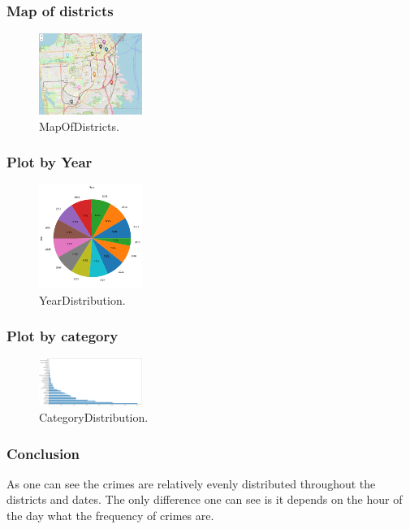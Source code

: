 \documentclass[../Main.tex]{subfiles}
\begin{document}
\subsubsection{Map of districts}
\begin{figure}[H]
\centering
\includegraphics[width=0.3\textwidth]{Resources/MapOfDistricts.png}
\caption{\label{fig:MapOfDistricts}MapOfDistricts.}
\end{figure}

\subsubsection{Plot by Year}
\begin{figure}[H]
\centering
\includegraphics[width=0.3\textwidth]{Resources/YearDistribution.png}
\caption{\label{fig:YearDistribution}YearDistribution.}
\end{figure}

\subsubsection{Plot by category}

\begin{figure}[H]
\centering
\includegraphics[width=0.3\textwidth]{Resources/CategoryDistribution.png}
\caption{\label{fig:CategoryDistribution}CategoryDistribution.}
\end{figure}




\subsubsection{Conclusion}
As one can see the crimes are relatively evenly distributed throughout the districts and dates. The only difference one can see is it depends on the hour of the day what the frequency of crimes are. 
\end{document}
